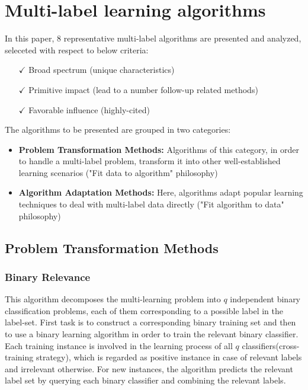 \documentclass[12pt]{report}
\begin{document}
	
	\section*{Multi-label learning algorithms}
	In this paper, 8 representative multi-label algorithms are presented and analyzed, seleceted with respect to below criteria:
	\begin{itemize}
		\item[$\checkmark$] Broad spectrum (unique characteristics)
		\item[$\checkmark$] Primitive impact (lead to a number follow-up related methods)
		\item[$\checkmark$] Favorable influence (highly-cited) 
	\end{itemize}
	
	The algorithms to be presented are grouped in two categories:
	\begin{itemize}
		\item \textbf{Problem Transformation Methods: }Algorithms of this category, in order to handle a multi-label problem, transform it into other well-established learning scenarios ("Fit data to algorithm" philosophy)
		\item \textbf{Algorithm Adaptation Methods: }Here, algorithms adapt popular learning techniques to deal with multi-label data directly ("Fit algorithm to data" philosophy)
	\end{itemize}

	\subsection*{Problem Transformation Methods}
	
	\subsubsection*{Binary Relevance}
	This algorithm decomposes the multi-learning problem into $q$ independent binary classification problems, each of them corresponding to a possible label in the label-set. First task is to construct a corresponding binary training set and then to use a binary learning algorithm in order to train the relevant binary classifier. Each training instance is involved in the learning process of all $q$ classifiers(cross-training strategy), which is regarded as positive instance in case of relevant labels and irrelevant otherwise. For new instances, the algorithm predicts the relevant label set by querying each binary classifier and combining the relevant labels.
	
\end{document}
